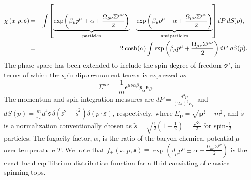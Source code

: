 \documentclass[12pt,aps,prd,nofootinbib,noshowkeys,noshowpacs,longbibliography,
superscriptaddress,tightenlines,floatfix,preprintnumbers]{revtex4-2}
\begin{document}
\begin{eqnarray}
    \chi \left(x,p,\mathfrak s\right) &=& \int \left[\underbrace{\exp \left(\beta_\mu p^\mu + \alpha  + \dfrac{\Omega_{\mu \nu}\Sigma^{\mu \nu}}{2} \right)}_{\rm particles} + \underbrace{\exp \left(\beta_\mu p^\mu -\alpha + \dfrac{\Omega_{\mu \nu}\Sigma^{\mu \nu}}{2} \right)}_{\rm antiparticles} \right] dP\, dS(p) ,\,\,\,\nonumber\\
    &=& 2\, \cosh(\alpha) \int  \exp \left(\beta_\mu p^\mu +  \dfrac{\Omega_{\mu \nu}\Sigma^{\mu \nu}}{2} \right)dP\ dS(p).
    \label{eq:EoS}
\end{eqnarray}
The phase space has been extended to include the spin degree of freedom $\mathfrak s^\mu$, in terms of which the spin dipole-moment tensor is expressed as 
\begin{equation}
 \Sigma^{\mu \nu}=\frac{1}{m}\epsilon^{\mu\nu\alpha\beta}p_\alpha \mathfrak s_\beta .  
\end{equation}
The momentum and spin integration measures are $dP = \frac{d^3 p}{(2\pi)^3 E_{\bm p}}$ and $dS(p) = \frac{m}{\pi \tilde{s}} d^4 \mathfrak s \,\delta(\mathfrak s^2-\tilde{s}^2)\delta (p \cdot \mathfrak s)$, respectively, where $E_{\bm p}=\sqrt{\bm p^2 + m^2}$, and $\tilde{s}$ is a normalization conventionally chosen as $\tilde{s} = \sqrt{\frac{1}{2}\left(1+\frac{1}{2}\right)}=\frac{\sqrt 3}{2}$ for spin-$\frac{1}{2}$ particles. The fugacity factor, $\alpha$, is the ratio of the baryon chemical potential $\mu$ over temperature $T$. We note that $f_\pm(x, p, \mathfrak s)\equiv\exp\left(\beta_\mu p^\mu \pm \alpha + \frac{\Omega_{\mu\nu}\Sigma^{\mu\nu}}{2}\right)$ is the exact local equilibrium distribution function for a fluid consisting of classical spinning tops.
\end{document}
